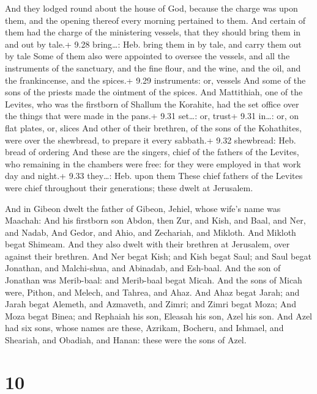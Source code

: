  And they lodged round about the house of God, because
the charge was upon them, and the opening thereof every morning
pertained to them.  And certain of them had the charge of
the ministering vessels, that they should bring them in and out by
tale.+ 9.28 bring\ldots: Heb. bring them in by tale, and carry them out
by tale  Some of them also were appointed to oversee the
vessels, and all the instruments of the sanctuary, and the fine flour,
and the wine, and the oil, and the frankincense, and the spices.+ 9.29
instruments: or, vessels  And some of the sons of the
priests made the ointment of the spices.  And Mattithiah,
one of the Levites, who was the firstborn of Shallum the Korahite, had
the set office over the things that were made in the pans.+ 9.31
set\ldots: or, trust+ 9.31 in\ldots: or, on flat plates, or, slices
 And other of their brethren, of the sons of the
Kohathites, were over the shewbread, to prepare it every sabbath.+ 9.32
shewbread: Heb. bread of ordering  And these are the
singers, chief of the fathers of the Levites, who remaining in the
chambers were free: for they were employed in that work day and night.+
9.33 they\ldots: Heb. upon them  These chief fathers of the
Levites were chief throughout their generations; these dwelt at
Jerusalem.

 And in Gibeon dwelt the father of Gibeon, Jehiel, whose
wife's name was Maachah:  And his firstborn son Abdon, then
Zur, and Kish, and Baal, and Ner, and Nadab,  And Gedor,
and Ahio, and Zechariah, and Mikloth.  And Mikloth begat
Shimeam. And they also dwelt with their brethren at Jerusalem, over
against their brethren.  And Ner begat Kish; and Kish begat
Saul; and Saul begat Jonathan, and Malchi-shua, and Abinadab, and
Esh-baal.  And the son of Jonathan was Merib-baal: and
Merib-baal begat Micah.  And the sons of Micah were,
Pithon, and Melech, and Tahrea, and Ahaz.  And Ahaz begat
Jarah; and Jarah begat Alemeth, and Azmaveth, and Zimri; and Zimri begat
Moza;  And Moza begat Binea; and Rephaiah his son, Eleasah
his son, Azel his son.  And Azel had six sons, whose names
are these, Azrikam, Bocheru, and Ishmael, and Sheariah, and Obadiah, and
Hanan: these were the sons of Azel.

\hypertarget{section-9}{%
\section{10}\label{section-9}}

